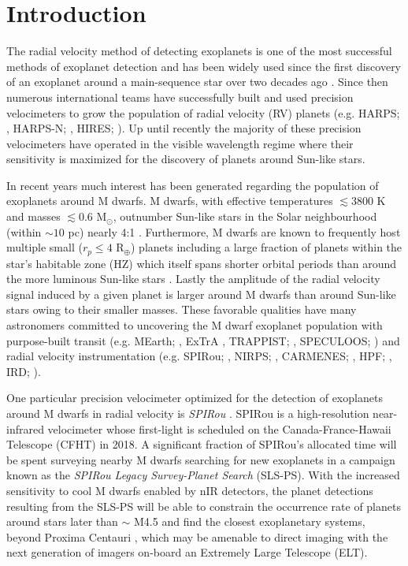 \section{Introduction} 
The radial velocity method of detecting exoplanets is one of the most
successful methods of exoplanet detection
and has been widely used since the first discovery of an
exoplanet around a main-sequence star over two decades ago \citep{mayor95}. 
Since then numerous international teams have successfully built and used
precision velocimeters to grow the population of radial velocity (RV) planets
(e.g. HARPS; \citealt{mayor03}, HARPS-N; \citealt{cosentino12}, HIRES; \citealt{vogt94}).
Up until recently the majority of 
these precision velocimeters have operated in the visible wavelength
regime where their sensitivity is maximized for the discovery of planets
around Sun-like stars. 

In recent years much interest has been generated regarding the population of
exoplanets around M dwarfs. M dwarfs, with effective temperatures
$\lesssim 3800$ K and masses $\lesssim 0.6$ M$_{\odot}$, outnumber Sun-like
stars in the Solar neighbourhood (within $\sim 10$ pc) nearly 4:1
\citep{henry09}. Furthermore, M dwarfs are known to frequently host multiple
small ($r_p \leq 4$ R$_{\oplus}$) planets \citep[e.g.][]{dressing15a, gaidos16}
including a large fraction of planets within the star's habitable zone (HZ)
which itself spans shorter orbital periods than around the more luminous
Sun-like stars \citep{kasting93, kopparapu13}.
Lastly the amplitude of the radial velocity signal induced by a given planet
is larger around M dwarfs than around Sun-like stars owing to their smaller
masses. These favorable qualities have many astronomers 
committed to uncovering the M dwarf exoplanet population with purpose-built
transit (e.g. MEarth; \citealt{irwin15}, ExTrA \citealt{bonfils15},
TRAPPIST; \citealt{gillon11}, SPECULOOS; \citealt{gillon13a})
and radial velocity instrumentation (e.g.
SPIRou; \citealt{delfosse13, artigau14}, NIRPS; \citealt{bouchy17}, CARMENES;
\citealt{quirrenbach14}, HPF; \citealt{mahadevan12}, IRD; \citealt{tamura12}).

One particular precision velocimeter optimized for the detection of
exoplanets around M dwarfs in radial velocity is \emph{SPIRou} \citep[Un
  Spectro-Polarim\`{e}tre Infra-Rouge;][]{delfosse13, artigau14}. SPIRou
is a high-resolution near-infrared velocimeter whose first-light is scheduled on
the Canada-France-Hawaii Telescope (CFHT) in 2018. A significant fraction of SPIRou's
allocated time will be spent surveying
nearby M dwarfs searching for new exoplanets in a campaign known as the
\emph{SPIRou Legacy Survey-Planet Search} (SLS-PS). With the increased
sensitivity to cool M dwarfs enabled by nIR detectors, the planet detections
resulting from the
SLS-PS will be able to constrain the occurrence rate of planets around stars
later than $\sim$ M4.5 and find the closest exoplanetary
systems, beyond Proxima Centauri \citep[1.3 pc;][]{angladaescude16}, which
may be amenable to direct imaging with the next generation of imagers on-board
an Extremely Large Telescope (ELT).

